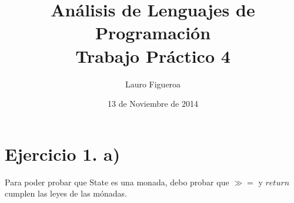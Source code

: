 \documentclass[a4paper,12pt]{article}
\begin{document}
\title{Análisis de Lenguajes de Programación\\ 
        Trabajo Práctico 4}
\author{Lauro Figueroa}
\date{13 de Noviembre de 2014}
\maketitle

\newpage
{}

\iffalse
\begin{fleqn}
\begin{align*}
    & \textrm{return } x \gg=  f
\\ = \;    & \langle \text{definición de return} \rangle
\end{align*}
\end{fleqn}
\fi

\section*{Ejercicio 1. a)}
Para poder probar que State es una monada, debo probar que $\gg=$ y $return$ cumplen
las leyes de las mónadas.
\end{document}
